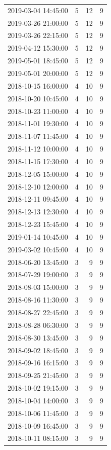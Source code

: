 \begin{tabular}{lrrr}
2019-03-04 14:45:00 & 5 & 12 & 9 \\
2019-03-26 21:00:00 & 5 & 12 & 9 \\
2019-03-26 22:15:00 & 5 & 12 & 9 \\
2019-04-12 15:30:00 & 5 & 12 & 9 \\
2019-05-01 18:45:00 & 5 & 12 & 9 \\
2019-05-01 20:00:00 & 5 & 12 & 9 \\
2018-10-15 16:00:00 & 4 & 10 & 9 \\
2018-10-20 10:45:00 & 4 & 10 & 9 \\
2018-10-23 11:00:00 & 4 & 10 & 9 \\
2018-11-01 19:30:00 & 4 & 10 & 9 \\
2018-11-07 11:45:00 & 4 & 10 & 9 \\
2018-11-12 10:00:00 & 4 & 10 & 9 \\
2018-11-15 17:30:00 & 4 & 10 & 9 \\
2018-12-05 15:00:00 & 4 & 10 & 9 \\
2018-12-10 12:00:00 & 4 & 10 & 9 \\
2018-12-11 09:45:00 & 4 & 10 & 9 \\
2018-12-13 12:30:00 & 4 & 10 & 9 \\
2018-12-23 15:45:00 & 4 & 10 & 9 \\
2019-01-14 10:45:00 & 4 & 10 & 9 \\
2019-03-02 10:45:00 & 4 & 10 & 9 \\
2018-06-20 13:45:00 & 3 & 9 & 9 \\
2018-07-29 19:00:00 & 3 & 9 & 9 \\
2018-08-03 15:00:00 & 3 & 9 & 9 \\
2018-08-16 11:30:00 & 3 & 9 & 9 \\
2018-08-27 22:45:00 & 3 & 9 & 9 \\
2018-08-28 06:30:00 & 3 & 9 & 9 \\
2018-08-30 13:45:00 & 3 & 9 & 9 \\
2018-09-02 18:45:00 & 3 & 9 & 9 \\
2018-09-16 16:15:00 & 3 & 9 & 9 \\
2018-09-25 21:45:00 & 3 & 9 & 9 \\
2018-10-02 19:15:00 & 3 & 9 & 9 \\
2018-10-04 14:00:00 & 3 & 9 & 9 \\
2018-10-06 11:45:00 & 3 & 9 & 9 \\
2018-10-09 16:45:00 & 3 & 9 & 9 \\
2018-10-11 08:15:00 & 3 & 9 & 9 \\

\end{tabular}
